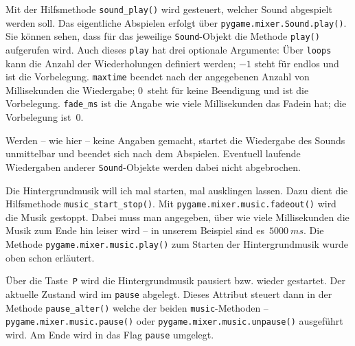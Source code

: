 Mit der Hilfsmethode \texttt{sound\_play()} wird gesteuert, welcher Sound abgespielt werden soll. Das eigentliche Abspielen erfolgt über \texttt{pygame.mixer.Sound.play()}. Sie können sehen, dass für das jeweilige \texttt{Sound}-Objekt die Methode \texttt{play()} aufgerufen wird. Auch dieses \texttt{play} hat drei optionale Argumente: Über \texttt{loops} kann die Anzahl der Wiederholungen definiert werden; $-1$ steht für endlos und ist die Vorbelegung. \texttt{maxtime} beendet nach der angegebenen Anzahl von Millisekunden die Wiedergabe; $0$~steht für keine Beendigung und ist die Vorbelegung. \texttt{fade\_ms} ist die Angabe wie viele Millisekunden das Fadein hat; die Vorbelegung ist~$0$.

Werden -- wie hier -- keine Angaben gemacht, startet die Wiedergabe des Sounds unmittelbar und beendet sich nach dem Abspielen. Eventuell laufende Wiedergaben anderer \texttt{Sound}-Objekte werden dabei nicht abgebrochen.


Die Hintergrundmusik will ich mal starten, mal ausklingen lassen. Dazu dient die Hilfsmethode \texttt{music\_start\_stop()}. Mit  \texttt{pygame.mixer.music.fadeout()} wird die Musik gestoppt. Dabei muss man angegeben, über wie viele Millisekunden die Musik zum Ende hin leiser wird -- in unserem Beispiel sind es~$5000~ms$. Die Methode \texttt{pygame.mixer.music\-.play()} zum Starten der Hintergrundmusik wurde oben schon erläutert.


Über die Taste~\texttt{P} wird die Hintergrundmusik pausiert bzw. wieder gestartet. Der aktuelle Zustand wird im \texttt{pause} abgelegt. Dieses Attribut steuert dann in der Methode \texttt{pause\_alter()} welche der beiden \texttt{music}-Methoden --  \texttt{pygame.mixer.music.pause()} oder \texttt{pygame.mixer.music.unpause()} ausgeführt wird. Am Ende wird in  das Flag \texttt{pause} umgelegt.

